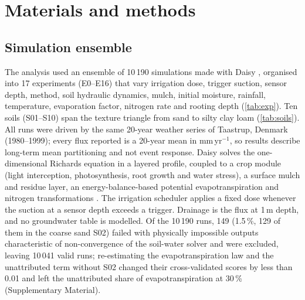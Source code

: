 \documentclass[review,12pt,authoryear]{elsarticle}
\begin{document}
\section{Materials and methods}
\subsection{Simulation ensemble}
\label{sec:methods}
The analysis used an ensemble of 10\,190 simulations made with Daisy \citep{Hansen2012,Holbak2026}, organised into 17 experiments (E0--E16) that vary irrigation dose, trigger suction, sensor depth, method, soil hydraulic dynamics, mulch, initial moisture, rainfall, temperature, evaporation factor, nitrogen rate and rooting depth (\cref{tab:exp}). Ten soils (S01--S10) span the texture triangle from sand to silty clay loam (\cref{tab:soils}). All runs were driven by the same 20-year weather series of Taastrup, Denmark (1980--1999); every flux reported is a 20-year mean in mm\,yr$^{-1}$, so results describe long-term mean partitioning and not event response. Daisy solves the one-dimensional Richards equation in a layered profile, coupled to a crop module (light interception, photosynthesis, root growth and water stress), a surface mulch and residue layer, an energy-balance-based potential evapotranspiration and nitrogen transformations \citep{Hansen1991,Hansen2012}. The irrigation scheduler applies a fixed dose whenever the suction at a sensor depth exceeds a trigger. Drainage is the flux at 1\,m depth, and no groundwater table is modelled. Of the 10\,190 runs, 149 (1.5\,\%, 129 of them in the coarse sand S02) failed with physically impossible outputs characteristic of non-convergence of the soil-water solver and were excluded, leaving 10\,041 valid runs; re-estimating the evapotranspiration law and the unattributed term without S02 changed their cross-validated scores by less than 0.01 and left the unattributed share of evapotranspiration at 30\,\% (Supplementary Material).
\end{document}
